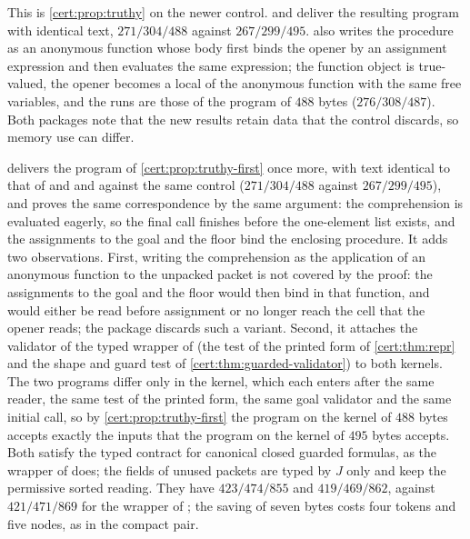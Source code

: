This is \cref{cert:prop:truthy} on the newer control. 
and  deliver the resulting program with identical text,
$271/304/488$ against $267/299/495$.  also writes the
procedure as an anonymous function whose body first binds the opener by an
assignment expression and then evaluates the same expression; the function
object is true-valued, the opener becomes a local of the anonymous function
with the same free variables, and the runs are those of the program of $488$
bytes ($276/308/487$). Both packages note that the new results retain data
that the control discards, so memory use can differ.

\begin{remark}\label{cert:rem:refinement-488}
 delivers the program of \cref{cert:prop:truthy-first} once
more, with text identical to that of  and
 and against the same control ($271/304/488$ against
$267/299/495$), and proves the same correspondence by the same argument: the
comprehension is evaluated eagerly, so the final call finishes before the
one-element list exists, and the assignments to the goal and the floor bind
the enclosing procedure. It adds two observations. First, writing the
comprehension as the application of an anonymous function to the unpacked
packet is not covered by the proof: the assignments to the goal and the floor
would then bind in that function, and would either be read before assignment
or no longer reach the cell that the opener reads; the package discards such
a variant. Second, it attaches the validator of the typed wrapper of
 (the test of the printed form of
\cref{cert:thm:repr} and the shape and guard test of
\cref{cert:thm:guarded-validator}) to both kernels. The two programs differ
only in the kernel, which each enters after the same reader, the same test of
the printed form, the same goal validator and the same initial call, so by
\cref{cert:prop:truthy-first} the program on the kernel of $488$ bytes
accepts exactly the inputs that the program on the kernel of $495$ bytes
accepts. Both satisfy the typed contract for canonical closed guarded
formulas, as the wrapper of  does; the fields of
unused packets are typed by $J$ only and keep the permissive sorted reading.
They have $423/474/855$ and $419/469/862$, against $421/471/869$ for the
wrapper of ; the saving of seven bytes costs four
tokens and five nodes, as in the compact pair.
\end{remark}

